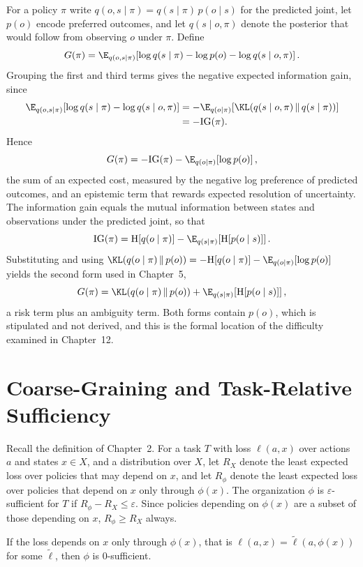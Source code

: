 For a policy $\pi$ write $q(o,s\mid\pi)=q(s\mid\pi)\,p(o\mid s)$ for the predicted joint, let $p(o)$ encode preferred outcomes, and let $q(s\mid o,\pi)$ denote the posterior that would follow from observing $o$ under $\pi$. Define
\[
G(\pi)=\E_{q(o,s\mid\pi)}\!\left[\log q(s\mid\pi)-\log p(o)-\log q(s\mid o,\pi)\right].
\]
Grouping the first and third terms gives the negative expected information gain, since
\begin{align*}
\E_{q(o,s\mid\pi)}\!\left[\log q(s\mid\pi)-\log q(s\mid o,\pi)\right]
&=-\E_{q(o\mid\pi)}\!\left[\KL\!\left(q(s\mid o,\pi)\,\|\,q(s\mid\pi)\right)\right]\\
&=-\mathrm{IG}(\pi).
\end{align*}
Hence
\[
G(\pi)=-\mathrm{IG}(\pi)-\E_{q(o\mid\pi)}\!\left[\log p(o)\right],
\]
the sum of an expected cost, measured by the negative log preference of predicted outcomes, and an epistemic term that rewards expected resolution of uncertainty. The information gain equals the mutual information between states and observations under the predicted joint, so that
\[
\mathrm{IG}(\pi)=\mathrm{H}\!\left[q(o\mid\pi)\right]-\E_{q(s\mid\pi)}\!\left[\mathrm{H}\!\left[p(o\mid s)\right]\right].
\]
Substituting and using $\KL\!\left(q(o\mid\pi)\,\|\,p(o)\right)=-\mathrm{H}[q(o\mid\pi)]-\E_{q(o\mid\pi)}[\log p(o)]$ yields the second form used in Chapter~5,
\[
G(\pi)=\KL\!\left(q(o\mid\pi)\,\|\,p(o)\right)+\E_{q(s\mid\pi)}\!\left[\mathrm{H}\!\left[p(o\mid s)\right]\right],
\]
a risk term plus an ambiguity term. Both forms contain $p(o)$, which is stipulated and not derived, and this is the formal location of the difficulty examined in Chapter~12.

\chapter{Coarse-Graining and Task-Relative Sufficiency}

Recall the definition of Chapter~2. For a task $T$ with loss $\ell(a,x)$ over actions $a$ and states $x\in X$, and a distribution over $X$, let $R_X$ denote the least expected loss over policies that may depend on $x$, and let $R_\phi$ denote the least expected loss over policies that depend on $x$ only through $\phi(x)$. The organization $\phi$ is $\varepsilon$-sufficient for $T$ if $R_\phi-R_X\le\varepsilon$. Since policies depending on $\phi(x)$ are a subset of those depending on $x$, $R_\phi\ge R_X$ always.

\begin{proposal}
If the loss depends on $x$ only through $\phi(x)$, that is $\ell(a,x)=\tilde\ell(a,\phi(x))$ for some $\tilde\ell$, then $\phi$ is $0$-sufficient.
\end{proposal}

